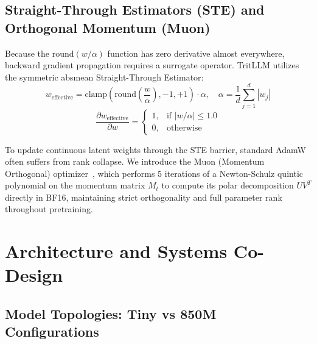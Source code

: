 \documentclass[11pt,a4paper]{article}
\begin{document}
\subsection{Straight-Through Estimators (STE) and Orthogonal Momentum (Muon)}

Because the $\text{round}(w / \alpha)$ function has zero derivative almost everywhere, backward gradient propagation requires a surrogate operator. TritLLM utilizes the symmetric absmean Straight-Through Estimator:
\begin{equation}
w_{\text{effective}} = \text{clamp}\left( \text{round}\left(\frac{w}{\alpha}\right), -1, +1 \right) \cdot \alpha, \quad \alpha = \frac{1}{d} \sum_{j=1}^d |w_j|
\end{equation}
\begin{equation}
\frac{\partial w_{\text{effective}}}{\partial w} = \begin{cases} 1, & \text{if } |w / \alpha| \le 1.0 \\ 0, & \text{otherwise} \end{cases}
\end{equation}

To update continuous latent weights through the STE barrier, standard AdamW often suffers from rank collapse. We introduce the Muon (Momentum Orthogonal) optimizer~\cite{jordan2024muon}, which performs 5 iterations of a Newton-Schulz quintic polynomial on the momentum matrix $M_t$ to compute its polar decomposition $U V^T$ directly in BF16, maintaining strict orthogonality and full parameter rank throughout pretraining.

\section{Architecture and Systems Co-Design}

\subsection{Model Topologies: Tiny vs 850M Configurations}
\end{document}
